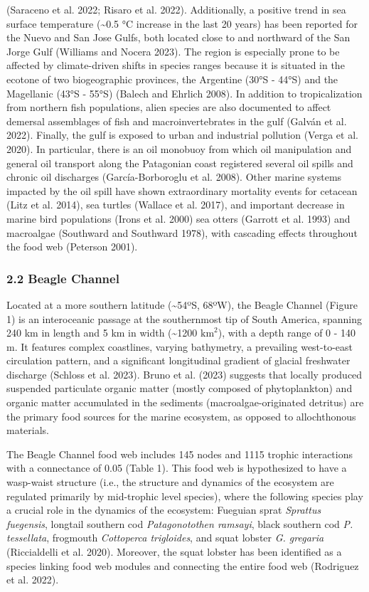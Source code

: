\documentclass[
]{article}
\begin{document}
(Saraceno et al. 2022; Risaro et al. 2022). Additionally, a positive
trend in sea surface temperature (\textasciitilde0.5 °C increase in the
last 20 years) has been reported for the Nuevo and San Jose Gulfs, both
located close to and northward of the San Jorge Gulf (Williams and
Nocera 2023). The region is especially prone to be affected by
climate-driven shifts in species ranges because it is situated in the
ecotone of two biogeographic provinces, the Argentine (30°S - 44°S) and
the Magellanic (43°S - 55°S) (Balech and Ehrlich 2008). In addition to
tropicalization from northern fish populations, alien species are also
documented to affect demersal assemblages of fish and macroinvertebrates
in the gulf (Galván et al. 2022). Finally, the gulf is exposed to urban
and industrial pollution (Verga et al. 2020). In particular, there is an
oil monobuoy from which oil manipulation and general oil transport along
the Patagonian coast registered several oil spills and chronic oil
discharges (García-Borboroglu et al. 2008). Other marine systems
impacted by the oil spill have shown extraordinary mortality events for
cetacean (Litz et al. 2014), sea turtles (Wallace et al. 2017), and
important decrease in marine bird populations (Irons et al. 2000) sea
otters (Garrott et al. 1993) and macroalgae (Southward and Southward
1978), with cascading effects throughout the food web (Peterson 2001).

\subsubsection{2.2 Beagle Channel}\label{beagle-channel}

Located at a more southern latitude (\textasciitilde54ºS, 68ºW), the
Beagle Channel (Figure 1) is an interoceanic passage at the southernmost
tip of South America, spanning 240 km in length and 5 km in width
(\textasciitilde1200 \(\text{km}^2\)), with a depth range of 0 - 140 m.
It features complex coastlines, varying bathymetry, a prevailing
west-to-east circulation pattern, and a significant longitudinal
gradient of glacial freshwater discharge (Schloss et al. 2023). Bruno et
al. (2023) suggests that locally produced suspended particulate organic
matter (mostly composed of phytoplankton) and organic matter accumulated
in the sediments (macroalgae-originated detritus) are the primary food
sources for the marine ecosystem, as opposed to allochthonous materials.

The Beagle Channel food web includes 145 nodes and 1115 trophic
interactions with a connectance of 0.05 (Table 1). This food web is
hypothesized to have a wasp-waist structure (i.e., the structure and
dynamics of the ecosystem are regulated primarily by mid-trophic level
species), where the following species play a crucial role in the
dynamics of the ecosystem: Fueguian sprat \emph{Sprattus fuegensis},
longtail southern cod \emph{Patagonotothen ramsayi}, black southern cod
\emph{P. tessellata}, frogmouth \emph{Cottoperca trigloides}, and squat
lobster \emph{G. gregaria} (Riccialdelli et al. 2020). Moreover, the
squat lobster has been identified as a species linking food web modules
and connecting the entire food web (Rodriguez et al. 2022).
\end{document}
